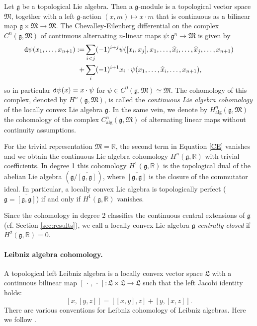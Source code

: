 \documentclass{article}
\newcommand{\R}{\mathbb{R}}
\newcommand{\dd}{{\tt d}}
\newcommand{\fg}{\mathfrak{g}}
\theoremstyle{definition}
\begin{document}
Let $\fg$ be a topological Lie algebra. Then a  $\mathfrak g$-module is a topological vector space 
$\mathfrak M$, together with a left $\fg$-action $(x, m) \mapsto x\cdot m$ that is continuous as a bilinear map $\mathfrak g\times \mathfrak M\to \mathfrak M$. 
The Chevalley-Eilenberg differential on the complex 
$C^n(\mathfrak{g},\mathfrak M)$ of continuous alternating $n$-linear maps $\psi \colon \fg^n \rightarrow \mathfrak M$  is given by 
\begin{align}\label{CE}
\dd \psi(x_1,\ldots,x_{n+1}):= &\sum_{ i<j}
(-1)^{i+j} \psi([x_i,x_j],x_1,\ldots,\widehat{x}_i, \ldots, 
\widehat{x}_j, \ldots, x_{n+1})\\ + &\sum _i (-1)^{i+1} {x_i}\cdot\psi(x_1,\ldots,\widehat{x}_i, \ldots, x_{n+1}),\nonumber
\end{align}
so in particular $\dd \psi(x)=x\cdot \psi$ for $\psi \in C^{0}(\fg, \mathfrak M)\simeq \mathfrak{M}$.
The cohomology of this complex, denoted  by $H^n(\mathfrak{g},\mathfrak M)$,
is called the \emph{continuous Lie algebra cohomology} of the locally convex Lie algebra $\mathfrak{g}$. 
In the same vein, we denote by $H_{\mathrm{alg}}^n(\mathfrak{g},\mathfrak M)$ the cohomology of the complex 
$C_{\mathrm{alg}}^n(\fg,\mathfrak{M})$ of alternating linear maps without continuity assumptions.

For the trivial representation $\mathfrak M=\mathbb R$, the second term in Equation \eqref{CE} vanishes and we obtain the continuous Lie algebra cohomology $H^n(\mathfrak{g},\R)$ with trivial coefficients. In degree 1 this cohomology $H^1(\mathfrak{g},\R)$ is the topological dual of the abelian Lie algebra 
$(\fg/\overline{[\fg,\fg]})$, where $\overline{[\fg,\fg]}$ is the closure of the commutator ideal.  In particular, a locally convex Lie algebra is 
topologically perfect ($\fg = \overline{[\fg,\fg]}$) if and only if $H^1(\fg,\R)$ vanishes. 


Since the cohomology in degree 2 classifies the continuous central extensions of $\fg$ (cf. Section \ref{sec:results}), we call a locally convex Lie algebra $\mathfrak g$ \emph{centrally closed} if $H^2(\mathfrak g, \mathbb R)=0$.





\paragraph{Leibniz algebra cohomology.}
A topological left Leibniz algebra is a locally convex vector space $\mathfrak L$ with a continuous bilinear map 
$[\,\cdot\,, \,\cdot\,]:\mathfrak L\times \mathfrak L\to \mathfrak L$ such that the left Jacobi identity holds:
$$[x,[y,z]]=[[x,y],z]+[y,[x,z]].$$
There are various conventions for Leibniz cohomology of Leibniz algebras. Here we follow 
\cite{FeldvossWagemann21}.
\end{document}
